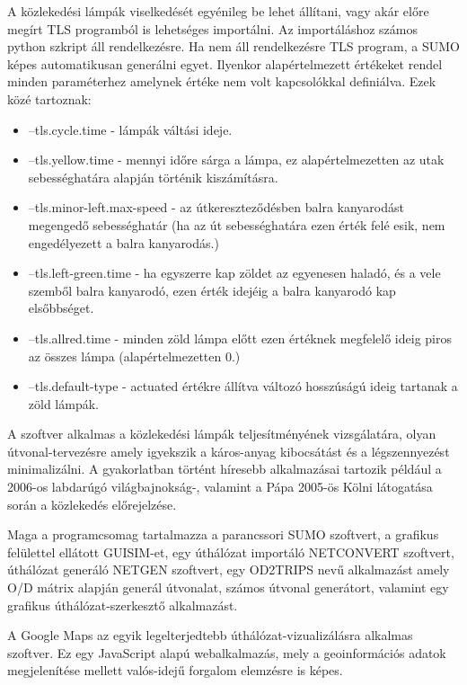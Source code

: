 A közlekedési lámpák viselkedését egyénileg be lehet állítani, vagy akár előre
megírt TLS programból is lehetséges importálni. Az importáláshoz számos python szkript áll rendelkezésre. Ha nem áll rendelkezésre TLS program, a SUMO képes automatikusan generálni
egyet. Ilyenkor alapértelmezett értékeket rendel minden paraméterhez amelynek értéke nem volt kapcsolókkal definiálva. Ezek közé tartoznak:
\begin{itemize}
\item --tls.cycle.time - lámpák váltási ideje.
\item --tls.yellow.time - mennyi időre sárga a lámpa, ez alapértelmezetten az utak sebességhatára alapján történik kiszámításra.
\item --tls.minor-left.max-speed - az útkereszteződésben balra kanyarodást megengedő sebességhatár (ha az út sebességhatára ezen érték felé esik, nem engedélyezett a balra kanyarodás.)
\item --tls.left-green.time - ha egyszerre kap zöldet az egyenesen haladó, és a vele szemből balra kanyarodó, ezen érték idejéig a balra kanyarodó kap elsőbbséget.
\item --tls.allred.time - minden zöld lámpa előtt ezen értéknek megfelelő ideig piros az összes lámpa (alapértelmezetten 0.)
\item --tls.default-type - actuated értékre állítva változó hosszúságú ideig tartanak a zöld lámpák.
\end{itemize}

A szoftver alkalmas a közlekedési lámpák teljesítményének vizsgálatára, olyan útvonal-tervezésre amely igyekszik a káros-anyag kibocsátást és a légszennyezést
minimalizálni. A gyakorlatban történt híresebb alkalmazásai tartozik például a 2006-os labdarúgó világbajnokság-, valamint a Pápa 2005-ös Kölni látogatása során a közlekedés előrejelzése.

Maga a programcsomag tartalmazza a parancssori SUMO szoftvert, a grafikus felülettel ellátott GUISIM-et, egy úthálózat importáló NETCONVERT szoftvert, úthálózat generáló NETGEN szoftvert, 
egy OD2TRIPS nevű alkalmazást amely O/D mátrix alapján generál útvonalat, számos útvonal generátort, valamint egy grafikus úthálózat-szerkesztő alkalmazást.

A Google Maps az egyik legelterjedtebb úthálózat-vizualizálásra alkalmas szoftver. Ez egy JavaScript alapú webalkalmazás, mely a geoinformációs adatok megjelenítése
mellett valós-idejű forgalom elemzésre is képes.\cite{mapsdoc}

